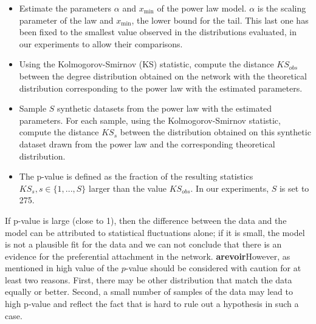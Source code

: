 \begin{itemize}
	\item Estimate the parameters $\alpha$ and $x_\text{min}$ of the power law model. $\alpha$ is the scaling parameter of the law and $x_\text{min}$, the lower bound for the tail. This last one has been fixed to the smallest value observed in the distributions evaluated, in our experiments to allow their comparisons.
	\item  Using the Kolmogorov-Smirnov (KS) statistic, compute the distance $KS_{obs}$  between the degree distribution obtained on the network with the theoretical distribution corresponding to the power law with the estimated parameters.
	\item Sample $S$ synthetic datasets from the power law with the estimated parameters. For each sample, using the Kolmogorov-Smirnov statistic, compute the distance $KS_{s}$ between the distribution obtained on this synthetic dataset drawn from the power law and the corresponding theoretical distribution. 
    \item  The p-value is defined as the fraction of  the resulting statistics $KS_s, s \in \{1,...,S\}$  larger than the value $KS_{obs}$.  In our experiments, $S$ is set to  275.
\end{itemize}

 If  p-value is large (close to 1), then the difference between the data and the model can be attributed to statistical fluctuations alone; if it is small, the model is not a plausible fit for the data and we can not conclude that there is an evidence for the preferential attachment in the network. 
\textbf{arevoir}However, as mentioned in \cite{clauset2009power} high value of the $p$-value should be considered with caution for at least two reasons. First, there may be other distribution that match the data equally or better. Second, a small number of samples of the data may lead to high p-value and reflect the fact that is hard to rule out a hypothesis in such a case.



